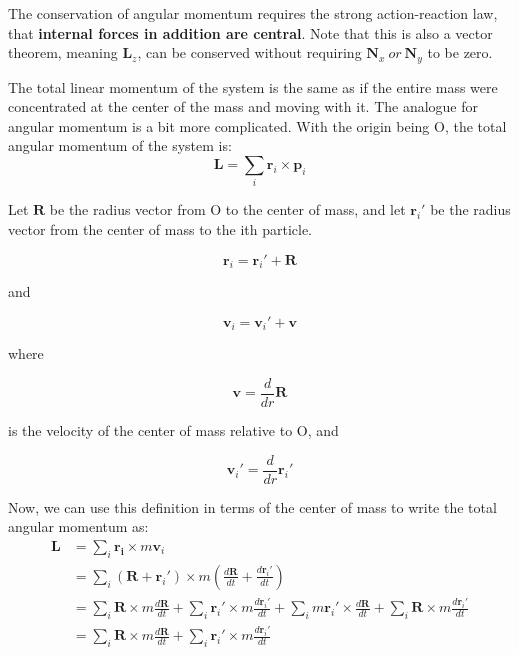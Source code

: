 \documentclass{article}
\begin{document}
The conservation of angular momentum requires the strong action-reaction law, that \textbf{internal forces in addition are central}. Note that this is also a vector theorem, meaning $\textbf{L}_z$, can be conserved without requiring $\textbf{N}_x \ or\ \textbf{N}_y$ to be zero.


The total linear momentum of the system is the same as if the entire mass were concentrated at the center of the mass and moving with it. The analogue for angular momentum is a bit more complicated. With the origin being O, the total angular momentum of the system is:\\

\begin{equation}
    \textbf{L} = \sum\limits_i \textbf{r}_i \times \textbf{p}_i
\end{equation}



Let $\textbf{R}$ be the radius vector from O to the center of mass, and let $\textbf{r}_i'$ be the radius vector from the center of mass to the ith particle. 

\begin{equation*}
    \textbf{r}_i = \textbf{r}_i' + \textbf{R}
\end{equation*}

and 

\begin{equation*}
    \textbf{v}_i = \textbf{v}_i' + \textbf{v}
\end{equation*}

where

\begin{equation*}
    \textbf{v} = \frac{d}{dr}\textbf{R}
\end{equation*}

is the velocity of the center of mass relative to O, and 

\begin{equation*}
    \textbf{v}_i' = \frac{d}{dr}\textbf{r}_i'
\end{equation*}

Now, we can use this definition in terms of the center of mass to write the total angular momentum as:
\\
\begin{align*}
\mathbf{L} &= \sum_i \mathbf{r_i} \times m\mathbf{v}_i\\
&= \sum_i (\mathbf{R}+\mathbf{r}_i')\times m\left(\frac{d\mathbf{R}}{dt}+\frac{d\mathbf{r}_i'}{dt}\right)\\
&= \sum_i \mathbf{R}\times m\frac{d\mathbf{R}}{dt} + \sum_i \mathbf{r}_i'\times m\frac{d\mathbf{r}_i'}{dt} + \sum_i m\mathbf{r}_i'\times \frac{d\mathbf{R}}{dt}+ \sum_i \mathbf{R}\times m\frac{d\mathbf{r}_i'}{dt}\\
&= \sum_i \mathbf{R}\times m\frac{d\mathbf{R}}{dt} + \sum_i \mathbf{r}_i'\times m\frac{d\mathbf{r}_i'}{dt}
\end{align*}
\end{document}
